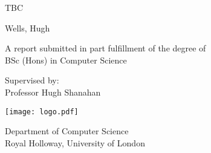 \begin{titlepage}
    \begin{center}
        
        \vspace*{2.5cm}
        
        \huge
        TBC
        
        \vspace{1.5cm}
        
        \Large
        Wells, Hugh

        \vspace{1.5cm}

        \normalsize
        A report submitted in part fulfillment of the degree of\\
        BSc (Hons) in Computer Science
        
        \vfill
        
        \normalsize
        Supervised by:\\
        Professor Hugh Shanahan 

        \vspace{0.8cm}

        \texttt{[image: logo.pdf]}
        
        \normalsize
        Department of Computer Science\\
        Royal Holloway, University of London

    \end{center}
\end{titlepage}
